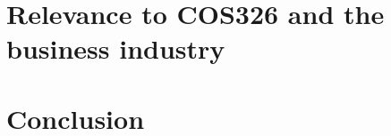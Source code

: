 \documentclass[hidelinks,english]{article}
\begin{document}
   
   \section{Relevance to COS326 and the business industry}
    
    \section{Conclusion}
	
	
	
\end{document}
